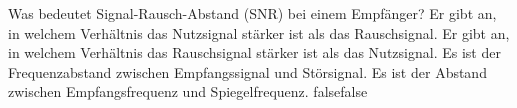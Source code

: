     {Was bedeutet Signal-Rausch-Abstand (SNR) bei einem Empfänger?}
    {Er gibt an, in welchem Verhältnis das Nutzsignal stärker ist als das Rauschsignal.}
    {Er gibt an, in welchem Verhältnis das Rauschsignal stärker ist als das Nutzsignal.}
    {Es ist der Frequenzabstand zwischen Empfangssignal und Störsignal.}
    {Es ist der Abstand zwischen Empfangsfrequenz und Spiegelfrequenz.}
    {false}{false}